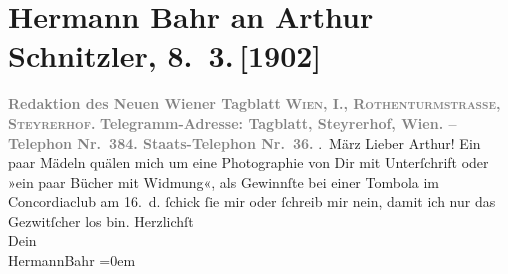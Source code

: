

         \renewcommand{\erwaehnteInstitutionen}{Institutionen: Concordia, Neues Wiener Tagblatt}
         \renewcommand{\erwaehnteOrte}{Orte: Steyrerhof, Wien}
         \renewcommand{\erwaehnteWerke}{}
               \section[Hermann Bahr an Arthur Schnitzler, 8. 3. {[}1902{]}]{ Hermann Bahr an Arthur Schnitzler, 8. 3. {[}1902{]}}\nopagebreak{}\rehead{ }\begin{ledgroupsized}[t]{13cm}\normalsize\beginnumbering \toendnotes[C]{\smallbreak\pagebreak[2]} 
\pstart
           \noindent{}\centering{}{\pb}\textcolor{gray}{\textbf{Redaktion des Neuen Wiener Tagblatt}}\pend
           \pstart
           \noindent{}\centering{}\textcolor{gray}{\textbf{\textsc{Wien, I., Rothenturmstrasse,
                        Steyrerhof.}}}\pend
           \pstart
           \noindent{}\centering{}\textcolor{gray}{\textbf{Telegramm-Adresse: Tagblatt, Steyrerhof, Wien. –
                     Telephon Nr. 384. Staats-Telephon Nr. 36.}}\pend
           . März\pend
           \pstart\center{}Lieber Arthur!\pend\pstart
           Ein paar Mädeln quälen mich um eine Photographie von Dir mit Unterſchrift oder »ein
               paar Bücher mit Widmung«, als Gewinnſte bei einer Tombola im Concordiaclub am 16. d.{ }ſchick ſie mir oder ſchreib mir nein, damit ich nur
               das Gezwitſcher los bin.\pend
           \pstart
           Herzlichſt{\\[\baselineskip]}Dein{\\[\baselineskip]}\spacefill\mbox{HermannBahr}\pend
           \leftskip=0em{}
         
         \endnumbering{}\end{ledgroupsized}  \newcommand{\dateiname}{L01207}\newcommand{\titel}{Hermann Bahr an Arthur Schnitzler, 8. 3. [1902]}\newcommand{\editorInnen}{ Kurt Ifkovits,  Martin Anton Müller}
      